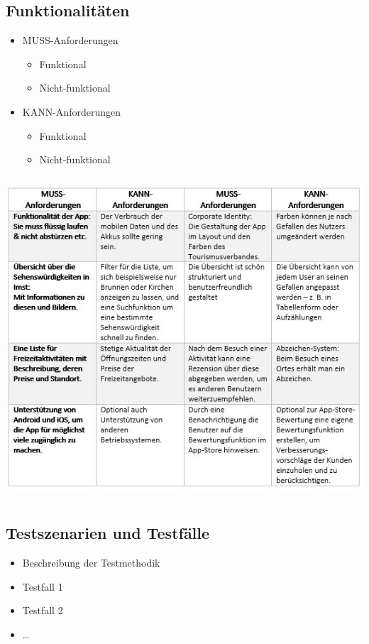 \subsection{Funktionalitäten}
\begin{itemize}
	\item MUSS-Anforderungen
	\begin{itemize}
		\item Funktional
		\item Nicht-funktional
	\end{itemize}
	\item KANN-Anforderungen
	\begin{itemize}
		\item Funktional
		\item Nicht-funktional
	\end{itemize}
\end{itemize}

\includegraphics[height=12cm]{musskann}\\

\subsection{Testszenarien und Testfälle}
\begin{itemize}
	\item Beschreibung der Testmethodik
	\item Testfall 1
	\item Testfall 2
	\item \ldots
\end{itemize}
